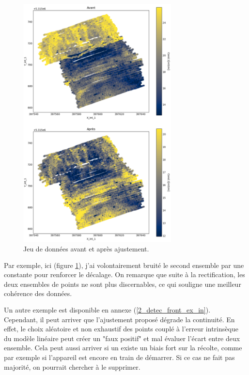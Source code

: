 \documentclass[12pt]{article}
\begin{document}
    \begin{figure}[ht!]
        \begin{center}
            \includegraphics[width=0.72\textwidth]{Images/Frontiere_ajust1-3.png}
            \caption{\label{2_avant_apres}Jeu de données avant et après ajustement.}
        \end{center}
    \end{figure}

    Par exemple, ici (figure \ref{2_avant_apres}), j'ai volontairement bruité le second ensemble par une constante pour renforcer le décalage. On remarque que suite à la rectification, les deux ensembles de points ne sont plus discernables, ce qui souligne une meilleur cohérence des données.
    
    \label{2_detec_front_ex_out} Un autre exemple est disponible en annexe (\ref{2_detec_front_ex_in}).\\

    Cependant, il peut arriver que l'ajustement proposé dégrade la continuité. En effet, le choix aléatoire et non exhaustif des points couplé à l'erreur intrinsèque du modèle linéaire peut créer un "faux positif" et mal évaluer l'écart entre deux ensemble. Cela peut aussi arriver si un existe un biais fort sur la récolte, comme par exemple si l'appareil est encore en train de démarrer. Si ce cas ne fait pas majorité, on pourrait chercher à le supprimer.
    
\end{document}
